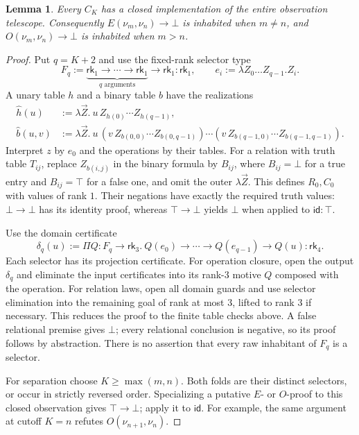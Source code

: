 \documentclass[11pt,a4paper]{article}
\newcommand{\rk}[1]{\mathsf{rk}_{#1}}
\newcommand{\num}[1]{\nu_{#1}}
\newtheorem{lemma}[theorem]{Lemma}
\theoremstyle{remark}\newtheorem*{remark}{Remark}
\begin{document}
\begin{lemma}\label{lem:finite}
Every $C_K$ has a closed implementation of the entire observation telescope.
Consequently $E(\num m,\num n)\to\bot$ is inhabited when $m\ne n$, and
$O(\num m,\num n)\to\bot$ is inhabited when $m>n$.
\end{lemma}
\begin{proof}
Put $q=K+2$ and use the fixed-rank selector type
\[
 F_q:=\underbrace{\rk1\to\cdots\to\rk1}_{q\text{ arguments}}\to\rk1:\rk1,
 \qquad e_i:=\lambda Z_0\ldots Z_{q-1}.Z_i.
\]
A unary table $h$ and a binary table $b$ have the realizations
\begin{align*}
 \widehat h(u)&:=\lambda\vec Z.\ u\,Z_{h(0)}\cdots Z_{h(q-1)},\\
 \widehat b(u,v)&:=\lambda\vec Z.\
 u\,(v\,Z_{b(0,0)}\cdots Z_{b(0,q-1)})\cdots
       (v\,Z_{b(q-1,0)}\cdots Z_{b(q-1,q-1)}).
\end{align*}
Interpret $z$ by $e_0$ and the operations by their tables. For a relation
with truth table $T_{ij}$, replace $Z_{b(i,j)}$ in the binary formula by
$B_{ij}$, where $B_{ij}=\bot$ for a true entry and $B_{ij}=\top$ for a false
one, and omit the outer $\lambda\vec Z$. This defines $R_0,C_0$ with values
of rank $1$. Their negations have exactly the required truth values:
$\bot\to\bot$ has its identity proof, whereas $\top\to\bot$ yields
$\bot$ when applied to $\mathsf{id}:\top$.

Use the domain certificate
\[
 \delta_q(u):=\Pi Q:F_q\to\rk3.\
 Q(e_0)\to\cdots\to Q(e_{q-1})\to Q(u):\rk4.
\]
Each selector has its projection certificate. For operation closure, open
the output $\delta_q$ and eliminate the input certificates into its
rank-$3$ motive $Q$ composed with the operation. For relation laws, open
all domain guards and use selector elimination into the remaining goal of
rank at most $3$, lifted to rank $3$ if necessary. This reduces the proof
to the finite table checks above. A false relational premise gives $\bot$;
every relational conclusion is negative, so its proof follows by abstraction.
There is no assertion that every raw inhabitant of $F_q$ is a selector.

For separation choose $K\geq\max(m,n)$. Both folds are their distinct
selectors, or occur in strictly reversed order. Specializing a putative
$E$- or $O$-proof to this closed observation gives $\top\to\bot$; apply it
to $\mathsf{id}$. For example, the same argument at cutoff $K=n$ refutes
$O(\num{n+1},\num n)$.
\end{proof}
\end{document}
